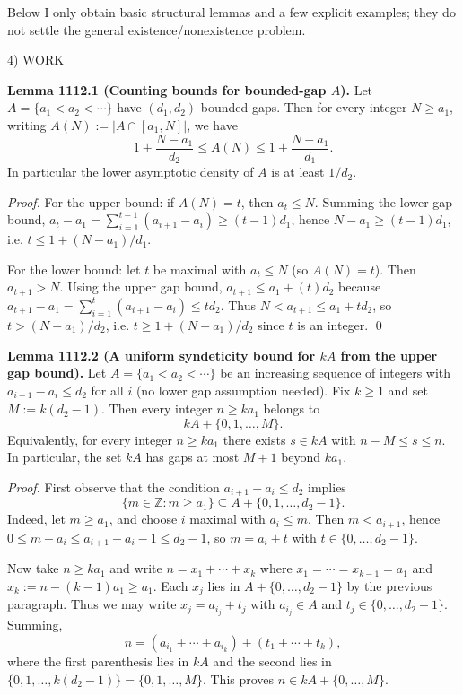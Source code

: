 Below I only obtain basic structural lemmas and a few explicit examples; they do not settle the general existence/nonexistence problem.

4) WORK

\textbf{Lemma 1112.1 (Counting bounds for bounded-gap \(A\)).}
Let \(A=\{a_1<a_2<\cdots\}\) have \((d_1,d_2)\)-bounded gaps.  Then for every integer \(N\ge a_1\), writing \(A(N):=|A\cap [a_1,N]|\), we have
\[
 1+\frac{N-a_1}{d_2} \le A(N) \le 1+\frac{N-a_1}{d_1}.
\]
In particular the lower asymptotic density of \(A\) is at least \(1/d_2\).

\emph{Proof.}
For the upper bound: if \(A(N)=t\), then \(a_t\le N\). Summing the lower gap bound,
\(a_t-a_1=\sum_{i=1}^{t-1}(a_{i+1}-a_i)\ge (t-1)d_1\), hence \(N-a_1\ge (t-1)d_1\), i.e.
\(t\le 1+(N-a_1)/d_1\).

For the lower bound: let \(t\) be maximal with \(a_t\le N\) (so \(A(N)=t\)). Then
\(a_{t+1}>N\). Using the upper gap bound,
\(a_{t+1}\le a_1+(t)d_2\) because
\(a_{t+1}-a_1=\sum_{i=1}^{t}(a_{i+1}-a_i)\le t d_2\).
Thus \(N<a_{t+1}\le a_1+t d_2\), so \(t> (N-a_1)/d_2\), i.e.
\(t\ge 1+(N-a_1)/d_2\) since \(t\) is an integer. \qed

\textbf{Lemma 1112.2 (A uniform syndeticity bound for \(kA\) from the upper gap bound).}
Let \(A=\{a_1<a_2<\cdots\}\) be an increasing sequence of integers with \(a_{i+1}-a_i\le d_2\) for all \(i\) (no lower gap assumption needed). Fix \(k\ge 1\) and set
\(M:=k(d_2-1)\).
Then every integer \(n\ge k a_1\) belongs to
\[
 kA + \{0,1,\dots,M\}.
\]
Equivalently, for every integer \(n\ge k a_1\) there exists \(s\in kA\) with \(n-M\le s\le n\). In particular, the set \(kA\) has gaps at most \(M+1\) beyond \(k a_1\).

\emph{Proof.}
First observe that the condition \(a_{i+1}-a_i\le d_2\) implies
\[
\{m\in\mathbb{Z}: m\ge a_1\}\subseteq A+\{0,1,\dots,d_2-1\}.
\]
Indeed, let \(m\ge a_1\), and choose \(i\) maximal with \(a_i\le m\). Then \(m<a_{i+1}\), hence
\(0\le m-a_i\le a_{i+1}-a_i-1\le d_2-1\), so \(m=a_i+t\) with \(t\in\{0,\dots,d_2-1\}\).

Now take \(n\ge k a_1\) and write
\(n = x_1+\cdots+x_k\) where \(x_1=\cdots=x_{k-1}=a_1\) and \(x_k:=n-(k-1)a_1\ge a_1\).
Each \(x_j\) lies in \(A+\{0,\dots,d_2-1\}\) by the previous paragraph. Thus we may write
\(x_j=a_{i_j}+t_j\) with \(a_{i_j}\in A\) and \(t_j\in\{0,\dots,d_2-1\}\). Summing,
\[
 n = (a_{i_1}+\cdots+a_{i_k}) + (t_1+\cdots+t_k),
\]
where the first parenthesis lies in \(kA\) and the second lies in \(\{0,1,\dots,k(d_2-1)\}=\{0,1,\dots,M\}\). This proves \(n\in kA+\{0,\dots,M\}\).

